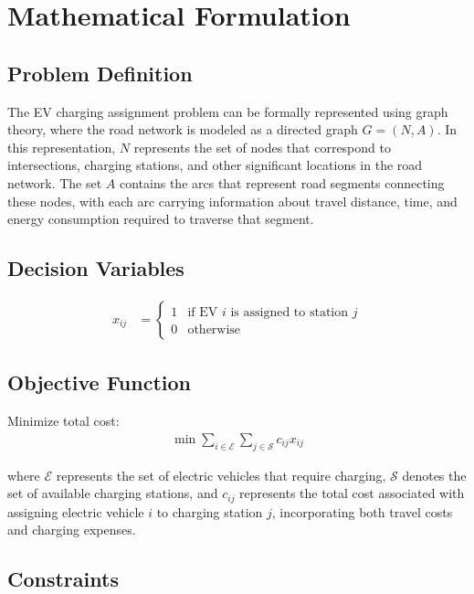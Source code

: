 \documentclass[12pt,a4paper]{article}
\begin{document}
\section{Mathematical Formulation}

\subsection{Problem Definition}

The EV charging assignment problem can be formally represented using graph theory, where the road network is modeled as a directed graph $G = (N, A)$. In this representation, $N$ represents the set of nodes that correspond to intersections, charging stations, and other significant locations in the road network. The set $A$ contains the arcs that represent road segments connecting these nodes, with each arc carrying information about travel distance, time, and energy consumption required to traverse that segment.

\subsection{Decision Variables}

\begin{align}
x_{ij} &= \begin{cases}
1 & \text{if EV } i \text{ is assigned to station } j \\
0 & \text{otherwise}
\end{cases}
\end{align}

\subsection{Objective Function}

Minimize total cost:
\begin{align}
\min \sum_{i \in \mathcal{E}} \sum_{j \in \mathcal{S}} c_{ij} x_{ij}
\end{align}

where $\mathcal{E}$ represents the set of electric vehicles that require charging, $\mathcal{S}$ denotes the set of available charging stations, and $c_{ij}$ represents the total cost associated with assigning electric vehicle $i$ to charging station $j$, incorporating both travel costs and charging expenses.

\subsection{Constraints}
\end{document}
